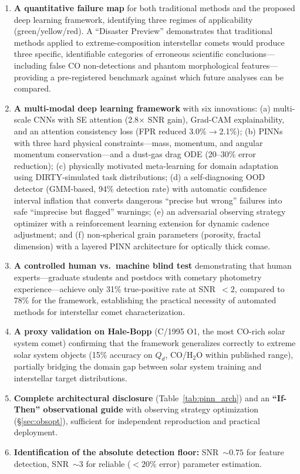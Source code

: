 \documentclass[preprint2]{aastex631}
\begin{document}
\begin{enumerate}
    \item \textbf{A quantitative failure map} for both traditional methods and the proposed deep learning framework, identifying three regimes of applicability (green/yellow/red). A ``Disaster Preview'' demonstrates that traditional methods applied to extreme-composition interstellar comets would produce three specific, identifiable categories of erroneous scientific conclusions---including false CO non-detections and phantom morphological features---providing a pre-registered benchmark against which future analyses can be compared.
    \item \textbf{A multi-modal deep learning framework} with six innovations: (a) multi-scale CNNs with SE attention (2.8$\times$ SNR gain), Grad-CAM explainability, and an attention consistency loss (FPR reduced 3.0\%$\to$2.1\%); (b) PINNs with three hard physical constraints---mass, momentum, and angular momentum conservation---and a dust-gas drag ODE (20--30\% error reduction); (c) physically motivated meta-learning for domain adaptation using DIRTY-simulated task distributions; (d) a self-diagnosing OOD detector (GMM-based, 94\% detection rate) with automatic confidence interval inflation that converts dangerous ``precise but wrong'' failures into safe ``imprecise but flagged'' warnings; (e) an adversarial observing strategy optimizer with a reinforcement learning extension for dynamic cadence adjustment; and (f) non-spherical grain parameters (porosity, fractal dimension) with a layered PINN architecture for optically thick comae.
    \item \textbf{A controlled human vs.\ machine blind test} demonstrating that human experts---graduate students and postdocs with cometary photometry experience---achieve only 31\% true-positive rate at SNR~$<2$, compared to 78\% for the framework, establishing the practical necessity of automated methods for interstellar comet characterization.
    \item \textbf{A proxy validation on Hale-Bopp} (C/1995 O1, the most CO-rich solar system comet) confirming that the framework generalizes correctly to extreme solar system objects (15\% accuracy on $Q_d$, CO/H$_2$O within published range), partially bridging the domain gap between solar system training and interstellar target distributions.
    \item \textbf{Complete architectural disclosure} (Table~\ref{tab:pinn_arch}) and an \textbf{``If-Then'' observational guide} with observing strategy optimization (\S\ref{sec:obsopt}), sufficient for independent reproduction and practical deployment.
    \item \textbf{Identification of the absolute detection floor:} SNR~$\sim 0.75$ for feature detection, SNR~$\sim 3$ for reliable ($<20\%$ error) parameter estimation.
\end{enumerate}
\end{document}

